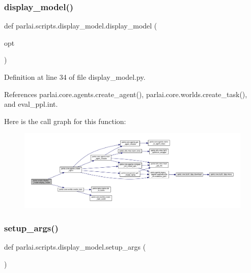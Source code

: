 \subsubsection{\texorpdfstring{display\+\_\+model()}{display\_model()}}
{\footnotesize\ttfamily def parlai.\+scripts.\+display\+\_\+model.\+display\+\_\+model (\begin{DoxyParamCaption}\item[{}]{opt }\end{DoxyParamCaption})}



Definition at line 34 of file display\+\_\+model.\+py.



References parlai.\+core.\+agents.\+create\+\_\+agent(), parlai.\+core.\+worlds.\+create\+\_\+task(), and eval\+\_\+ppl.\+int.

Here is the call graph for this function\+:
\nopagebreak
\begin{figure}[H]
\begin{center}
\leavevmode
\includegraphics[width=350pt]{namespaceparlai_1_1scripts_1_1display__model_a25488b354b0b8cbaee28b146b17c26f1_cgraph}
\end{center}
\end{figure}
\mbox{\label{namespaceparlai_1_1scripts_1_1display__model_a9141f8dde0f690b4d641fe08c193e2b5}} 
\subsubsection{\texorpdfstring{setup\+\_\+args()}{setup\_args()}}
{\footnotesize\ttfamily def parlai.\+scripts.\+display\+\_\+model.\+setup\+\_\+args (\begin{DoxyParamCaption}{ }\end{DoxyParamCaption})}



